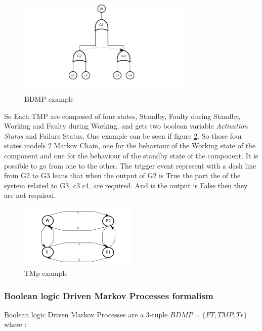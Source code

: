 \begin{figure}[h]
    \centering
	\includegraphics[width=0.75\textwidth]{schema/BDMP.pdf}
    \caption{BDMP example}
    \label{bdmp}
\end{figure}


So Each TMP are composed of four states, Standby, Faulty during
Standby, Working and Faulty during Working, and gets two boolean
variable \emph{Activation Status} and Failure Status. One example can be
seen if figure \ref{tmp}. \newline
So those four states models 2 Markov Chain, one for the behaviour of
the Working state of the component and one for the behaviour of the
standby state of the component. It is possible to  go from one to the
other. \newline
The trigger event represent with a dash line from G2 to G3 leans that
when the output of G2 is True the part the of the system related to
G3, c3 c4, are required. And is the output is False then they are not
required.

\newpage

\begin{figure}[h]
    \centering
	\includegraphics[width=0.5\textwidth]{schema/TMP.pdf}
    \caption{TMp example}
    \label{tmp}
\end{figure}


\subsubsection{Boolean logic Driven Markov Processes formalism}

Boolean logic Driven Markov Processes are a 3-tuple $BDMP = \{FT, TMP, Tr\}$ where :

